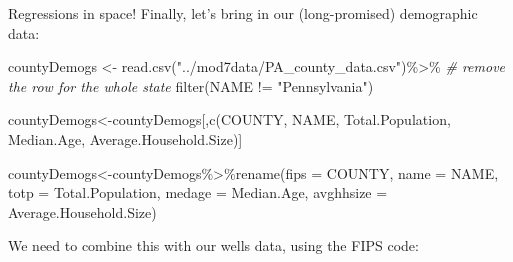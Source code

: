 \documentclass[
  ignorenonframetext,
]{beamer}
\newenvironment{Shaded}{\begin{snugshade}}{\end{snugshade}}
\newcommand{\AttributeTok}[1]{\textcolor[rgb]{0.77,0.63,0.00}{#1}}
\newcommand{\CommentTok}[1]{\textcolor[rgb]{0.56,0.35,0.01}{\textit{#1}}}
\newcommand{\FunctionTok}[1]{\textcolor[rgb]{0.00,0.00,0.00}{#1}}
\newcommand{\NormalTok}[1]{#1}
\newcommand{\OtherTok}[1]{\textcolor[rgb]{0.56,0.35,0.01}{#1}}
\newcommand{\SpecialCharTok}[1]{\textcolor[rgb]{0.00,0.00,0.00}{#1}}
\newcommand{\StringTok}[1]{\textcolor[rgb]{0.31,0.60,0.02}{#1}}
\begin{document}
\begin{frame}[fragile]{Regressions in space!}
\protect\hypertarget{regressions-in-space-1}{}
Finally, let's bring in our (long-promised) demographic data: \tiny

\begin{Shaded}
\begin{Highlighting}[]
\NormalTok{countyDemogs }\OtherTok{\textless{}{-}} \FunctionTok{read.csv}\NormalTok{(}\StringTok{"../mod7data/PA\_county\_data.csv"}\NormalTok{)}\SpecialCharTok{\%\textgreater{}\%}
        \CommentTok{\# remove the row for the whole state}
          \FunctionTok{filter}\NormalTok{(NAME }\SpecialCharTok{!=} \StringTok{"Pennsylvania"}\NormalTok{)}

\NormalTok{countyDemogs}\OtherTok{\textless{}{-}}\NormalTok{countyDemogs[,}\FunctionTok{c}\NormalTok{(}\StringTok{\textquotesingle{}COUNTY\textquotesingle{}}\NormalTok{, }\StringTok{\textquotesingle{}NAME\textquotesingle{}}\NormalTok{, }\StringTok{\textquotesingle{}Total.Population\textquotesingle{}}\NormalTok{,}
                              \StringTok{\textquotesingle{}Median.Age\textquotesingle{}}\NormalTok{, }\StringTok{\textquotesingle{}Average.Household.Size\textquotesingle{}}\NormalTok{)] }

\NormalTok{countyDemogs}\OtherTok{\textless{}{-}}\NormalTok{countyDemogs}\SpecialCharTok{\%\textgreater{}\%}\FunctionTok{rename}\NormalTok{(}\AttributeTok{fips =} \StringTok{\textquotesingle{}COUNTY\textquotesingle{}}\NormalTok{, }\AttributeTok{name =} \StringTok{\textquotesingle{}NAME\textquotesingle{}}\NormalTok{, }\AttributeTok{totp =} \StringTok{\textquotesingle{}Total.Population\textquotesingle{}}\NormalTok{,}
                  \AttributeTok{medage =} \StringTok{\textquotesingle{}Median.Age\textquotesingle{}}\NormalTok{, }\AttributeTok{avghhsize =} \StringTok{\textquotesingle{}Average.Household.Size\textquotesingle{}}\NormalTok{)}
\end{Highlighting}
\end{Shaded}

\normalsize

We need to combine this with our wells data, using the FIPS code:

\tiny

\begin{Shaded}
\end{Shaded}
\end{frame}
\end{document}

